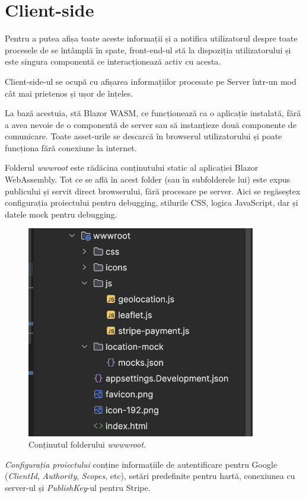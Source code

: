 \section{Client-side}

Pentru a putea afișa toate aceste informații și a notifica utilizatorul despre toate procesele de se întâmplă în spate,
front-end-ul stă la dispoziția utilizatorului și este singura componentă ce interacționează activ cu acesta.

Client-side-ul se ocupă cu afișarea informațiilor procesate pe Server într-un mod cât mai prietenos și ușor de înțeles.

La bază acestuia, stă Blazor WASM, ce funcționează ca o aplicație instalată, fără a avea nevoie de o componentă de server sau să instanțieze
două componente de comunicare. Toate asset-urile se descarcă în browserul utilizatorului și poate funcționa fără conexiune la internet.

Folderul \textit{wwwroot} este rădăcina conținutului static al aplicației Blazor WebAssembly.
Tot ce se află în acest folder (sau în subfolderele lui) este expus publicului și servit direct browserului, fără procesare pe server.
Aici se regăseștex configurația proiectului pentru debugging, stilurile CSS, logica JavaScript, dar și datele mock pentru debugging.

\begin{figure}[H]
    \centering
    \includegraphics[width=10cm]{Assets/wwwroot.png}
    \caption{Conținutul folderului \textit{wwwwroot}.}
    \label{fig:wwwroot}
\end{figure}

\textit{Configurația proiectului} conține informațiile de autentificare pentru Google (\textit{ClientId}, \textit{Authority}, \textit{Scopes}, etc),
setări predefinite pentru hartă, conexiunea cu server-ul și \textit{PublishKey}-ul pentru Stripe.

